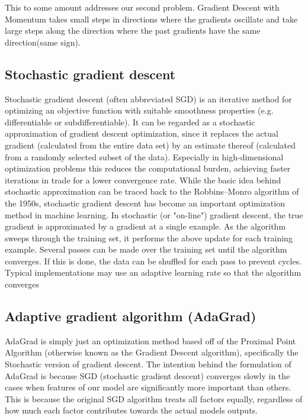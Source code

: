 This to some amount addresses our second problem. Gradient Descent with Momentum takes small 
steps in directions where the gradients oscillate and take large steps along the direction where
the past gradients have the same direction(same sign).

\subsection{Stochastic gradient descent}
Stochastic gradient descent (often abbreviated SGD) is an iterative method for optimizing an
objective function with suitable smoothness properties (e.g. differentiable or subdifferentiable).
It can be regarded as a stochastic approximation of gradient descent optimization, since it 
replaces the actual gradient (calculated from the entire data set) by an estimate thereof 
(calculated from a randomly selected subset of the data). Especially in high-dimensional 
optimization problems this reduces the computational burden,
achieving faster iterations in trade for a lower convergence rate.
While the basic idea behind stochastic approximation can be traced back to the Robbins–Monro 
algorithm of the 1950s, stochastic gradient descent has become an important optimization
method in machine learning. 
In stochastic (or "on-line") gradient descent, the true gradient  is approximated by a gradient
at a single example.
As the algorithm sweeps through the training set, it performs the above update for each training
example. Several passes can be made over the training set until the algorithm converges.
If this is done, the data can be shuffled for each pass to prevent cycles.
Typical implementations may use an adaptive learning rate so that the algorithm converges

\subsection{Adaptive gradient algorithm (AdaGrad)}
AdaGrad is simply just an optimization method based off of the Proximal Point Algorithm 
(otherwise known as the Gradient Descent algorithm), specifically the Stochastic version
of gradient descent.
The intention behind the formulation of AdaGrad is because SGD (stochastic gradient descent) 
converges slowly in the cases when features of our model are significantly more 
important than others. 
This is because the original SGD algorithm treats all factors equally, regardless of how much
each factor contributes towards the actual models outputs.


